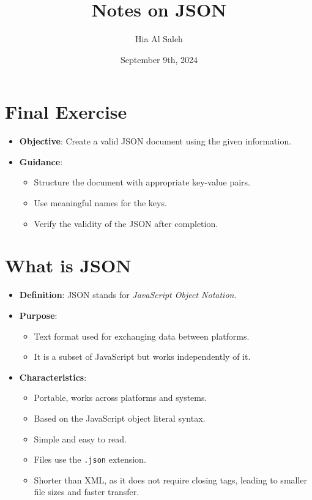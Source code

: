 \documentclass{article}
\title{Notes on JSON}
\author{Hia Al Saleh}
\date{September 9th, 2024}
\begin{document}
\maketitle
\tableofcontents
\newpage 


\section{Final Exercise}

\begin{itemize}
    \item \textbf{Objective}: Create a valid JSON document using the given information.
    \item \textbf{Guidance}:
    \begin{itemize}
        \item Structure the document with appropriate key-value pairs.
        \item Use meaningful names for the keys.
        \item Verify the validity of the JSON after completion.
    \end{itemize}
\end{itemize}

\section{What is JSON}

\begin{itemize}
    \item \textbf{Definition}: JSON stands for \textit{JavaScript Object Notation}.
    \item \textbf{Purpose}: 
    \begin{itemize}
        \item Text format used for exchanging data between platforms.
        \item It is a subset of JavaScript but works independently of it.
    \end{itemize}
    \item \textbf{Characteristics}:
    \begin{itemize}
        \item Portable, works across platforms and systems.
        \item Based on the JavaScript object literal syntax.
        \item Simple and easy to read.
        \item Files use the \texttt{.json} extension.
        \item Shorter than XML, as it does not require closing tags, leading to smaller file sizes and faster transfer.
    \end{itemize}
\end{itemize}
\end{document}
